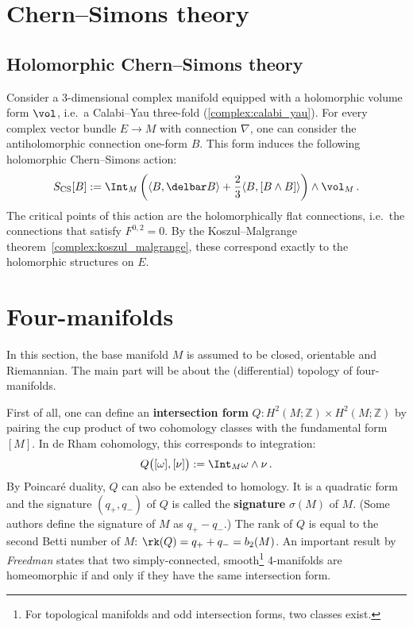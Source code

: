 
\section{Chern--Simons theory}
\subsection{Holomorphic Chern--Simons theory}

    Consider a 3-dimensional complex manifold equipped with a holomorphic volume form $\vol$, i.e.~a Calabi--Yau three-fold (\cref{complex:calabi_yau}). For every complex vector bundle $E\rightarrow M$ with connection $\nabla$, one can consider the antiholomorphic connection one-form $B$. This form induces the following holomorphic Chern--Simons action:
    \begin{gather}
        S_{\text{CS}}[B]:=\Int_M\left(\langle B,\delbar B \rangle+\frac{2}{3}
        \langle B,[B\wedge B] \rangle\right)\wedge\vol_M\,.
    \end{gather}
    The critical points of this action are the holomorphically flat connections, i.e.~the connections that satisfy $F^{0,2}=0$. By the Koszul--Malgrange theorem~\ref{complex:koszul_malgrange}, these correspond exactly to the holomorphic structures on $E$.

\section{Four-manifolds}

    In this section, the base manifold $M$ is assumed to be closed, orientable and Riemannian. The main part will be about the (differential) topology of four-manifolds.

    First of all, one can define an \textbf{intersection form} $Q:H^2(M;\mathbb{Z})\times H^2(M;\mathbb{Z})$ by pairing the cup product of two cohomology classes with the fundamental form $[M]$. In de Rham cohomology, this corresponds to integration:
    \begin{gather}
        Q\bigl([\omega],[\nu]\bigr) := \Int_M\omega\wedge\nu\,.
    \end{gather}
    By Poincar\'e duality, $Q$ can also be extended to homology. It is a quadratic form and the signature $(q_+,q_-)$ of $Q$ is called the \textbf{signature} $\sigma(M)$ of $M$. (Some authors define the signature of $M$ as $q_+-q_-$.) The rank of $Q$ is equal to the second Betti number of $M$: $\rk(Q)=q_++q_-=b_2(M)$. An important result by \textit{Freedman} states that two simply-connected, smooth\footnote{For topological manifolds and odd intersection forms, two classes exist.} 4-manifolds are homeomorphic if and only if they have the same intersection form.

